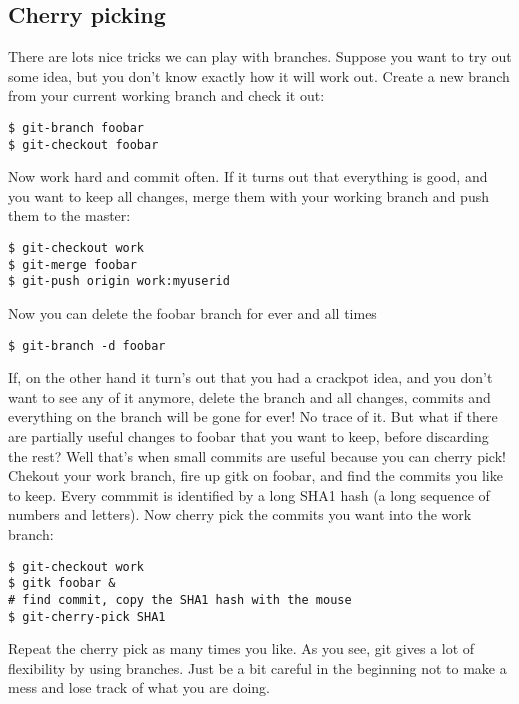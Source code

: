 \documentclass[a4paper,10pt]{article}
\begin{document}
\subsection{Cherry picking}
\label{sec:cherry}
There are lots nice tricks we can play with
branches. Suppose you want to try out some idea, but you don't know exactly
how it will work out. Create a new branch from your current working branch and
check it out:
\begin{verbatim}
$ git-branch foobar
$ git-checkout foobar
\end{verbatim}
Now work hard and commit often. If it turns out that everything is good, and
you want to keep all changes, merge them with your working branch and push
them to the master:
\begin{verbatim}
$ git-checkout work
$ git-merge foobar
$ git-push origin work:myuserid
\end{verbatim}
Now you can delete the foobar branch for ever and all times
\begin{verbatim}
$ git-branch -d foobar
\end{verbatim}
If, on the other hand it turn's out that you had a crackpot idea, and you
don't want to see any of it anymore, delete the branch and all changes,
commits and everything on the branch will be gone for ever! No trace of it.
But what if there are partially useful changes to foobar that you want to
keep, before discarding the rest? Well that's when small commits are useful
because you can cherry pick! Chekout your work branch, fire up gitk on foobar,
and find the commits you like to keep. Every commmit is identified by a long
SHA1 hash (a long sequence of numbers and letters). Now cherry pick the
commits you want into the work branch:
\begin{verbatim}
$ git-checkout work
$ gitk foobar &
# find commit, copy the SHA1 hash with the mouse
$ git-cherry-pick SHA1
\end{verbatim}
Repeat the cherry pick as many times you like. As you see, git gives a lot of
flexibility by using branches. Just be a bit careful in the beginning not to
make a mess and lose track of what you are doing. 
\end{document}
